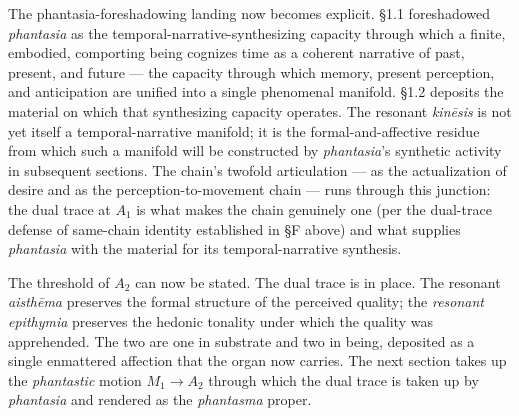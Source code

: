 \documentclass{article}
\begin{document}
The phantasia-foreshadowing landing now becomes explicit. §1.1 foreshadowed \textit{phantasia} as the temporal-narrative-synthesizing capacity through which a finite, embodied, comporting being cognizes time as a coherent narrative of past, present, and future --- the capacity through which memory, present perception, and anticipation are unified into a single phenomenal manifold. §1.2 deposits the material on which that synthesizing capacity operates. The resonant \textit{kinēsis} is not yet itself a temporal-narrative manifold; it is the formal-and-affective residue from which such a manifold will be constructed by \textit{phantasia}'s synthetic activity in subsequent sections. The chain's twofold articulation --- as the actualization of desire and as the perception-to-movement chain --- runs through this junction: the dual trace at $A_1$ is what makes the chain genuinely one (per the dual-trace defense of same-chain identity established in §F above) and what supplies \textit{phantasia} with the material for its temporal-narrative synthesis.

The threshold of $A_2$ can now be stated. The dual trace is in place. The resonant \textit{aisthēma} preserves the formal structure of the perceived quality; the \textit{resonant epithymia} preserves the hedonic tonality under which the quality was apprehended. The two are one in substrate and two in being, deposited as a single enmattered affection that the organ now carries. The next section takes up the \textit{phantastic} motion $M_1 \rightarrow A_2$ through which the dual trace is taken up by \textit{phantasia} and rendered as the \textit{phantasma} proper.
\end{document}
